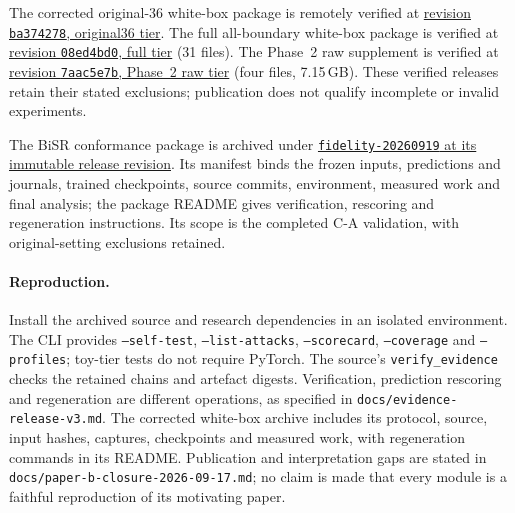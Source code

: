 \documentclass[11pt]{article}
\begin{document}
The corrected original-36 white-box package is remotely verified at \href{https://huggingface.co/datasets/Setloop/llm-attacker-paper-b/tree/ba37427807a29f217e6fefb565c5e468e9bdac81/whitebox35-20260917/original36}{revision \texttt{ba374278}, original36 tier}. The full all-boundary white-box package is verified at \href{https://huggingface.co/datasets/Setloop/llm-attacker-paper-b/tree/08ed4bd07ecde7613eff62826f6cce6638415d7b/whitebox35-20260917/full}{revision \texttt{08ed4bd0}, full tier} (31 files). The Phase~2 raw supplement is verified at \href{https://huggingface.co/datasets/Setloop/llm-attacker-paper-b/tree/7aac5e7b1e9db9978ef1ef1366eb9bc5a4637ed4/revision-20260917/phase2-raw}{revision \texttt{7aac5e7b}, Phase~2 raw tier} (four files, 7.15\,GB). These verified releases retain their stated exclusions; publication does not qualify incomplete or invalid experiments.

The BiSR conformance package is archived under \href{https://huggingface.co/datasets/Setloop/llm-attacker-paper-b/tree/be59bdca280258ac82ce358cae5f1e0c529869c2/fidelity-20260919/evidence}{\texttt{fidelity-20260919} at its immutable release revision}. Its manifest binds the frozen inputs, predictions and journals, trained checkpoints, source commits, environment, measured work and final analysis; the package README gives verification, rescoring and regeneration instructions. Its scope is the completed C-A validation, with original-setting exclusions retained.

\paragraph{Reproduction.}
Install the archived source and research dependencies in an isolated environment. The CLI provides \texttt{--self-test}, \texttt{--list-attacks}, \texttt{--scorecard}, \texttt{--coverage} and \texttt{--profiles}; toy-tier tests do not require PyTorch. The source's \texttt{verify\_evidence} checks the retained chains and artefact digests. Verification, prediction rescoring and regeneration are different operations, as specified in \nolinkurl{docs/evidence-release-v3.md}. The corrected white-box archive includes its protocol, source, input hashes, captures, checkpoints and measured work, with regeneration commands in its README. Publication and interpretation gaps are stated in \nolinkurl{docs/paper-b-closure-2026-09-17.md}; no claim is made that every module is a faithful reproduction of its motivating paper.


\end{document}
